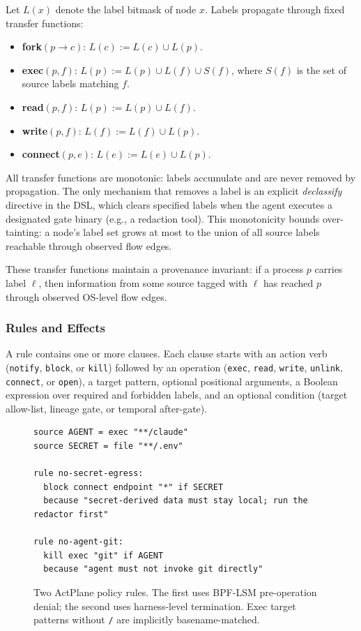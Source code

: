 Let $L(x)$ denote the label bitmask of node $x$. Labels propagate through
fixed transfer functions:

\begin{itemize}
\item \textbf{fork}$(p \to c)$: $L(c) := L(c) \cup L(p)$.
\item \textbf{exec}$(p, f)$: $L(p) := L(p) \cup L(f) \cup S(f)$, where
$S(f)$ is the set of source labels matching $f$.
\item \textbf{read}$(p, f)$: $L(p) := L(p) \cup L(f)$.
\item \textbf{write}$(p, f)$: $L(f) := L(f) \cup L(p)$.
\item \textbf{connect}$(p, e)$: $L(e) := L(e) \cup L(p)$.
\end{itemize}

All transfer functions are monotonic: labels accumulate and are never
removed by propagation. The only mechanism that removes a label is an
explicit \emph{declassify} directive in the DSL, which clears specified
labels when the agent executes a designated gate binary (e.g., a redaction
tool). This monotonicity bounds over-tainting: a node's label set grows
at most to the union of all source labels reachable through observed flow
edges.

These transfer functions maintain a provenance invariant: if a process $p$
carries label $\ell$, then information from some source tagged with $\ell$
has reached $p$ through observed OS-level flow edges.

\subsubsection{Rules and Effects}

A rule contains one or more clauses. Each clause starts with an action verb
(\texttt{notify}, \texttt{block}, or \texttt{kill}) followed by an
operation (\texttt{exec}, \texttt{read}, \texttt{write}, \texttt{unlink},
\texttt{connect}, or \texttt{open}), a target pattern, optional positional
arguments, a Boolean expression over required and forbidden labels, and an
optional condition (target allow-list, lineage gate, or temporal after-gate).

\begin{figure}[t]
\begin{verbatim}
source AGENT = exec "**/claude"
source SECRET = file "**/.env"

rule no-secret-egress:
  block connect endpoint "*" if SECRET
  because "secret-derived data must stay local; run the redactor first"

rule no-agent-git:
  kill exec "git" if AGENT
  because "agent must not invoke git directly"
\end{verbatim}
\caption{Two ActPlane policy rules. The first uses BPF-LSM pre-operation
denial; the second uses harness-level termination. Exec target patterns
without \texttt{/} are implicitly basename-matched.}
\label{fig:policy-example}
\end{figure}

